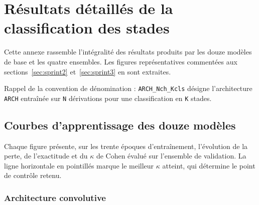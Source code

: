 \appendix

\chapter{Résultats détaillés de la classification des stades}
\label{annexe:staging}

Cette annexe rassemble l'intégralité des résultats produits par les douze modèles de
base et les quatre ensembles. Les figures représentatives commentées aux
sections~\ref{sec:sprint2} et~\ref{sec:sprint3} en sont extraites.

Rappel de la convention de dénomination : \texttt{ARCH\_Nch\_Kcls} désigne
l'architecture \texttt{ARCH} entraînée sur \texttt{N} dérivations pour une
classification en \texttt{K} stades.

\section{Courbes d'apprentissage des douze modèles}

Chaque figure présente, sur les trente époques d'entraînement, l'évolution de la
perte, de l'exactitude et du $\kappa$ de Cohen évalué sur l'ensemble de validation.
La ligne horizontale en pointillés marque le meilleur $\kappa$ atteint, qui détermine
le point de contrôle retenu.

\subsection{Architecture convolutive}

